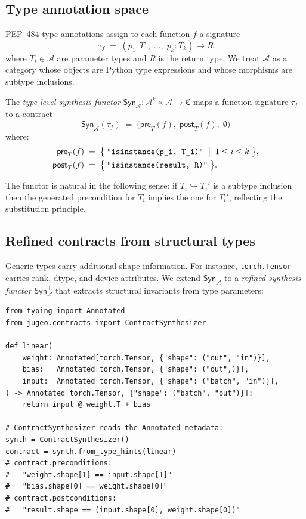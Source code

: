\documentclass[11pt]{article}
\newcommand{\Syn}{\mathsf{Syn}}            %
\newcommand{\Pre}{\mathsf{pre}}            %
\newcommand{\Post}{\mathsf{post}}          %
\newcommand{\TypeAnn}{\mathcal{A}}         %
\newcommand{\ContractSpace}{\mathfrak{C}}  %
\newcommand{\SynT}{\Syn_{\TypeAnn}}        %
\begin{document}
\subsection{Type annotation space}

PEP~484 type annotations assign to each function $f$ a signature
\[
  \tau_f \;=\; (p_1 : T_1,\; \ldots,\; p_k : T_k) \to R
\]
where $T_i \in \TypeAnn$ are parameter types and $R$ is the return
type.  We treat $\TypeAnn$ as a category whose objects are Python type
expressions and whose morphisms are subtype inclusions.

\begin{definition}\label{def:synT}
The \emph{type-level synthesis functor}
$\SynT\colon \TypeAnn^k \times \TypeAnn \to \ContractSpace$
maps a function signature $\tau_f$ to a contract
\[
  \SynT(\tau_f) \;=\; \bigl(\Pre_T(f),\; \Post_T(f),\; \emptyset\bigr)
\]
where:
\begin{align*}
  \Pre_T(f) &\;=\;\bigl\{\;\texttt{"isinstance(p\_i, T\_i)"} \;\bigm|\; 1 \le i \le k\;\bigr\},\\
  \Post_T(f) &\;=\;\bigl\{\;\texttt{"isinstance(result, R)"}\;\bigr\}.
\end{align*}
\end{definition}

The functor is natural in the following sense: if $T_i \hookrightarrow
T_i'$ is a subtype inclusion then the generated precondition for $T_i$
implies the one for $T_i'$, reflecting the substitution principle.

\subsection{Refined contracts from structural types}

Generic types carry additional shape information.  For instance,
\texttt{torch.Tensor} carries rank, dtype, and device attributes.  We
extend $\SynT$ to a \emph{refined synthesis functor} $\SynT^+$ that
extracts structural invariants from type parameters:

\begin{lstlisting}[style=jugeo-python,
  caption={Type-level synthesis: extracting shape constraints from
           \texttt{Annotated} hints.}]
from typing import Annotated
from jugeo.contracts import ContractSynthesizer

def linear(
    weight: Annotated[torch.Tensor, {"shape": ("out", "in")}],
    bias:   Annotated[torch.Tensor, {"shape": ("out",)}],
    input:  Annotated[torch.Tensor, {"shape": ("batch", "in")}],
) -> Annotated[torch.Tensor, {"shape": ("batch", "out")}]:
    return input @ weight.T + bias

# ContractSynthesizer reads the Annotated metadata:
synth = ContractSynthesizer()
contract = synth.from_type_hints(linear)
# contract.preconditions:
#   "weight.shape[1] == input.shape[1]"
#   "bias.shape[0] == weight.shape[0]"
# contract.postconditions:
#   "result.shape == (input.shape[0], weight.shape[0])"
\end{lstlisting}
\end{document}
